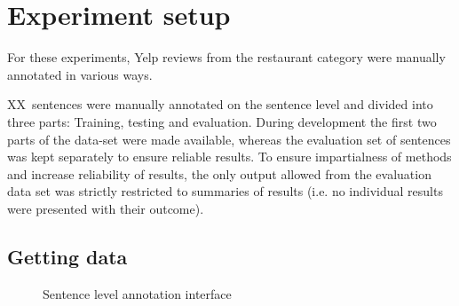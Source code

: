 \documentclass[a4paper,11pt]{kth-mag}
\newcommand{\category}{restaurant category }  %
\newcommand{\numAnnotated}{XX}
\newif\ifhasStudiedFailures
\begin{document}
\section{Experiment setup}
For these experiments, Yelp reviews from the \category were manually annotated in various ways.

\numAnnotated~sentences were manually annotated on the sentence level and divided into three parts: Training, testing and evaluation. During development the first two parts of the data-set were made available, whereas the evaluation set of sentences was kept separately to ensure reliable results. To ensure impartialness of methods and increase reliability of results, the only output allowed from the evaluation data set was strictly restricted to summaries of results (i.e. no individual results were presented with their outcome)\ifhasStudiedFailures, except for when failing instances were explicitly studied after method development was finished\fi.

\newpage
\subsection{Getting data}
\label{subsec:getting_data}
\begin{figure}[h]
  \centering
  \caption{Sentence level annotation interface}
  \label{fig:annotate_sentence}
\end{figure}
\end{document}
